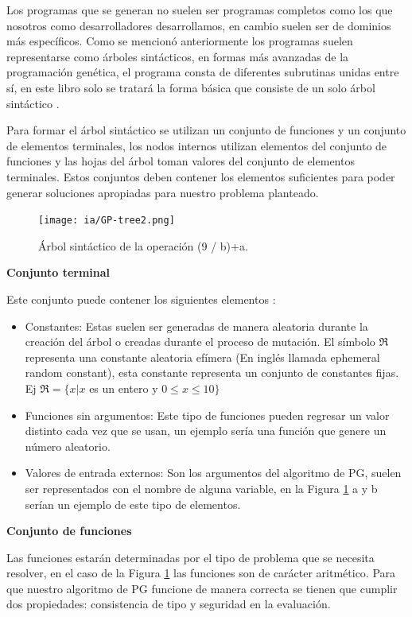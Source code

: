 \documentclass[11pt,fleqn]{book} %
\begin{document}
Los programas que se generan no suelen ser programas completos como los que nosotros como desarrolladores desarrollamos, en cambio suelen ser de dominios más específicos. Como se mencionó anteriormente los programas suelen representarse como árboles sintácticos, en formas más avanzadas de la programación genética, el programa consta de diferentes subrutinas unidas entre sí, en este libro solo se tratará la forma básica que consiste de un solo árbol sintáctico \cite{opensourceLGP}.

Para formar el árbol sintáctico se utilizan un conjunto de funciones y un conjunto de elementos terminales, los nodos internos utilizan elementos del conjunto de funciones y las hojas del árbol toman valores del conjunto de elementos terminales. Estos conjuntos deben contener los elementos suficientes para poder generar soluciones apropiadas para nuestro problema planteado.

\begin{figure}[ht]
\centering\texttt{[image: ia/GP-tree2.png]}
\caption{Árbol sintáctico de la operación (9 / b)+a.}
\label{fig:GP-tree2} 
\end{figure}

\textbf{Conjunto terminal}

Este conjunto puede contener los siguientes elementos \cite{opensourceLGP}:
\begin{itemize}
\item Constantes: Estas suelen ser generadas de manera aleatoria durante la creación del árbol o creadas durante el proceso de mutación. El símbolo $\Re$ representa una constante aleatoria efímera (En inglés llamada ephemeral random constant), esta constante representa un conjunto de constantes fijas. Ej $\Re = \{ x | x$ es un entero y $0 \leq x \leq 10 \}$
\item Funciones sin argumentos: Este tipo de funciones pueden regresar un valor distinto cada vez que se usan, un ejemplo sería una función que genere un número aleatorio.
\item Valores de entrada externos: Son los argumentos del algoritmo de PG, suelen ser representados con el nombre de alguna variable, en la Figura \ref{fig:GP-tree2} a y b serían un ejemplo de este tipo de elementos.
\end{itemize}

\textbf{Conjunto de funciones}

Las funciones estarán determinadas por el tipo de problema que se necesita resolver, en el caso de la Figura \ref{fig:GP-tree2} las funciones son de carácter aritmético.
Para que nuestro algoritmo de PG funcione de manera correcta se tienen que cumplir dos propiedades: consistencia de tipo y seguridad en la evaluación.
\end{document}
